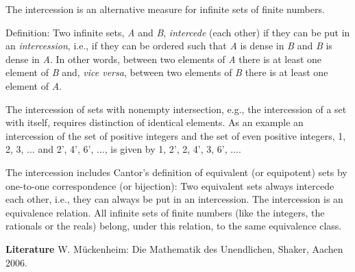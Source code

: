 \documentclass[12pt]{article}
\begin{document}

The intercession is an alternative measure for infinite sets of finite numbers.

Definition: Two infinite sets, \emph{A} and \emph{B}, \emph{intercede} (each other) if they can be put in an \emph{intercession}, i.e., if they can be ordered such that \emph{A} is dense in \emph{B} and \emph{B} is dense in \emph{A}. In other words, between two elements of \emph{A} there is at least one element of \emph{B} and, \emph{vice versa}, between two elements of \emph{B} there is at least one element of \emph{A}.

The intercession of sets with nonempty intersection, e.g., the intercession of a set with itself, requires distinction of identical elements. As an example an intercession of the set of positive integers and the set of even positive integers, 1, 2, 3, ... and 2', 4', 6', ..., is given by 1, 2', 2, 4', 3, 6', ....

The intercession includes Cantor's definition of equivalent (or equipotent) sets by one-to-one correspondence (or bijection): Two equivalent sets always intercede each other, i.e., they can always be put in an intercession. The intercession is an equivalence relation. All infinite sets of finite numbers (like the integers, the rationals or the reals) belong, under this relation, to the same equivalence class.

\textbf{Literature} W. M\"uckenheim: Die Mathematik des Unendlichen, Shaker, Aachen 2006.

\end{document}
